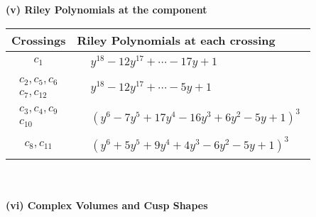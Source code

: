 \documentclass[1p]{elsarticle_modified}
\theoremstyle{definition}
\begin{document}
\newpage\renewcommand{\arraystretch}{1}
\flushleft \textbf{(v) Riley Polynomials at the component}\newline \\
\begin{tabular}{m{50pt}|m{274pt}}
Crossings & \hspace{64pt}Riley Polynomials at each crossing \\
\hline $$\begin{aligned}c_{1}\end{aligned}$$&$\begin{aligned}
&y^{18}-12 y^{17}+\cdots-17 y+1
\end{aligned}$\\
\hline $$\begin{aligned}c_{2},c_{5},c_{6}\\c_{7},c_{12}\end{aligned}$$&$\begin{aligned}
&y^{18}-12 y^{17}+\cdots-5 y+1
\end{aligned}$\\
\hline $$\begin{aligned}c_{3},c_{4},c_{9}\\c_{10}\end{aligned}$$&$\begin{aligned}
&(y^6-7 y^5+17 y^4-16 y^3+6 y^2-5 y+1)^3
\end{aligned}$\\
\hline $$\begin{aligned}c_{8},c_{11}\end{aligned}$$&$\begin{aligned}
&(y^6+5 y^5+9 y^4+4 y^3-6 y^2-5 y+1)^3
\end{aligned}$\\
\hline
\end{tabular}\\~\\
\newpage\flushleft \textbf{(vi) Complex Volumes and Cusp Shapes}
\end{document}
